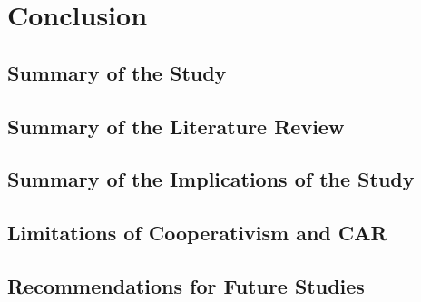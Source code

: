 \chapter{Conclusion}

\section{Summary of the Study}

\section{Summary of the Literature Review}

\section{Summary of the Implications of the Study}

\section{Limitations of Cooperativism and CAR}

\section{Recommendations for Future Studies}